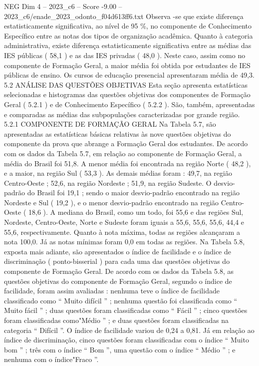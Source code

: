 \begin{textsample}{NEG Dim 4 – 2023\_c6 – Score -9.00 – 2023\_c6/enade\_2023\_odonto\_f04d613ff6.txt}
Observa -se que existe diferença estatisticamente significativa, ao nível de 95 \%, no componente de Conhecimento Específico entre as notas dos tipos de organização acadêmica.
Quanto à categoria administrativa, existe diferença estatisticamente significativa entre as médias das IES públicas ( 58,1 ) e as das IES privadas ( 48,0 ).
Neste caso, assim como no componente de Formação Geral, a maior média foi obtida por estudantes de IES públicas de ensino.
Os cursos de educação presencial apresentaram média de 49,3. 5.2 ANÁLISE DAS QUESTÕES OBJETIVAS Esta seção apresenta estatísticas selecionadas e histogramas das questões objetivas dos componentes de Formação Geral ( 5.2.1 ) e de Conhecimento Específico ( 5.2.2 ).
São, também, apresentadas e comparadas as médias das subpopulações caracterizadas por grande região. 5.2.1 COMPONENTE DE FORMAÇÃO GERAL Na Tabela 5.7, são apresentadas as estatísticas básicas relativas às nove questões objetivas do componente da prova que abrange a Formação Geral dos estudantes.
De acordo com os dados da Tabela 5.7, em relação ao componente de Formação Geral, a média do Brasil foi 51,8.
A menor média foi encontrada na região Norte ( 48,2 ), e a maior, na região Sul ( 53,3 ).
As demais médias foram : 49,7, na região Centro-Oeste ; 52,6, na região Nordeste ; 51,9, na região Sudeste.
O desvio-padrão do Brasil foi 19,1 ; sendo o maior desvio-padrão encontrado na região Nordeste e Sul ( 19,2 ), e o menor desvio-padrão encontrado na região Centro-Oeste ( 18,6 ).
A mediana do Brasil, como um todo, foi 55,6 e das regiões Sul, Nordeste, Centro-Oeste, Norte e Sudeste foram iguais a 55,6, 55,6, 55,6, 44,4 e 55,6, respectivamente.
Quanto à nota máxima, todas as regiões alcançaram a nota 100,0.
Já as notas mínimas foram 0,0 em todas as regiões.
Na Tabela 5.8, exposta mais adiante, são apresentados o índice de facilidade e o índice de discriminação ( ponto-bisserial ) para cada uma das questões objetivas do componente de Formação Geral.
De acordo com os dados da Tabela 5.8, as questões objetivas do componente de Formação Geral, segundo o índice de facilidade, foram assim avaliadas : nenhuma teve o índice de facilidade classificado como “ Muito difícil ” ; nenhuma questão foi classificada como “ Muito fácil ” ; duas questões foram classificadas como “ Fácil ” ; cinco questões foram classificadas como"Médio ” ; e duas questões foram classificadas na categoria “ Difícil ”.
O índice de facilidade variou de 0,24 a 0,81.
Já em relação ao índice de discriminação, cinco questões foram classificadas com o índice “ Muito bom ” ; três com o índice “ Bom ”, uma questão com o índice “ Médio ” ; e nenhuma com o índice"Fraco ”.

\end{textsample}
